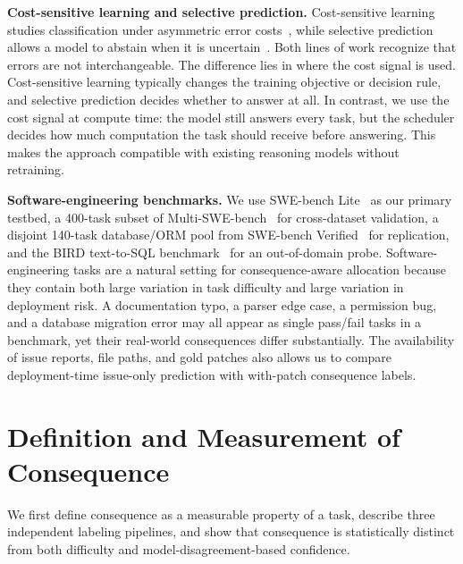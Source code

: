 \documentclass{article}
\begin{document}
\textbf{Cost-sensitive learning and selective prediction.}
Cost-sensitive learning studies classification under asymmetric error
costs~\citep{elkan2001foundations}, while selective prediction allows
a model to abstain when it is uncertain~\citep{geifman2017selective}.
Both lines of work recognize that errors are not interchangeable. The
difference lies in where the cost signal is used. Cost-sensitive learning
typically changes the training objective or decision rule, and selective prediction decides whether to answer at all. In contrast, we use the cost signal at compute time: the model still answers every
task, but the scheduler decides how much computation the task should receive before answering. This makes the approach compatible with existing reasoning models without retraining.

\textbf{Software-engineering benchmarks.}
We use SWE-bench Lite~\citep{jimenez2023swebench} as our primary testbed, a 400-task subset of Multi-SWE-bench~\citep{ma2024multiswebench}
for cross-dataset validation, a disjoint 140-task database/ORM pool
from SWE-bench Verified~\citep{openai2024swebenchverified} for
replication, and the BIRD text-to-SQL
benchmark~\citep{li2023bird} for an out-of-domain probe. Software-engineering tasks are a natural setting for consequence-aware allocation because they contain both large variation in task difficulty and large variation in deployment
risk. A documentation typo, a parser edge case, a permission bug, and a database migration error may all appear as single pass/fail tasks in a benchmark, yet their real-world consequences differ substantially.
The availability of issue reports, file paths, and gold patches also allows us to compare deployment-time issue-only prediction with with-patch consequence labels.

\section{Definition and Measurement of Consequence}
\label{sec:cons}

We first define consequence as a measurable property of a task, describe three independent labeling pipelines, and show that consequence is statistically distinct from both difficulty and model-disagreement-based confidence.
\end{document}
